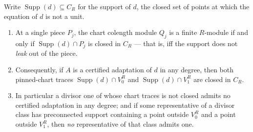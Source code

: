 \begin{theorem}
  \label{thm:isCertified_chart_obstruction}
  \leanok
  Write \(\operatorname{Supp}(d) \subseteq C_R\) for the support of \(d\), the closed set
  of points at which the equation of \(d\) is not a unit.
  \begin{enumerate}
    \item At a single piece \(P_j\), the chart colength module \(Q_j\) is a finite
      \(R\)-module if and only if \(\operatorname{Supp}(d) \cap P_j\) is closed in \(C_R\)
      --- that is, iff the support does not \emph{leak} out of the piece.
    \item Consequently, if \(A\) is a certified adaptation of \(d\) in any degree, then both
      pinned-chart traces \(\operatorname{Supp}(d) \cap V_0^R\) and
      \(\operatorname{Supp}(d) \cap V_1^R\) are closed in \(C_R\).
    \item In particular a divisor one of whose chart traces is not closed admits no
      certified adaptation in any degree; and if some representative of a divisor class has
      preconnected support containing a point outside \(V_0^R\) and a point outside
      \(V_1^R\), then \emph{no} representative of that class admits one.
  \end{enumerate}
\end{theorem}
